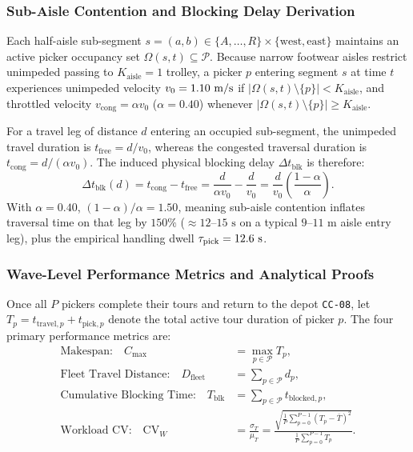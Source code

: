\documentclass[11pt,a4paper]{article}
\begin{document}
\subsubsection{Sub-Aisle Contention and Blocking Delay Derivation}
Each half-aisle sub-segment $s = (a, b) \in \{A, \dots, R\} \times \{\text{west}, \text{east}\}$ maintains an active picker occupancy set $\Omega(s, t) \subseteq \mathcal{P}$. Because narrow footwear aisles restrict unimpeded passing to $K_{\text{aisle}} = 1$ trolley, a picker $p$ entering segment $s$ at time $t$ experiences unimpeded velocity $v_0 = 1.10\text{ m/s}$ if $|\Omega(s, t) \setminus \{p\}| < K_{\text{aisle}}$, and throttled velocity $v_{\text{cong}} = \alpha v_0$ ($\alpha = 0.40$) whenever $|\Omega(s, t) \setminus \{p\}| \ge K_{\text{aisle}}$.

For a travel leg of distance $d$ entering an occupied sub-segment, the unimpeded travel duration is $t_{\text{free}} = d / v_0$, whereas the congested traversal duration is $t_{\text{cong}} = d / (\alpha v_0)$. The induced physical blocking delay $\Delta t_{\text{blk}}$ is therefore:
\begin{equation}
    \Delta t_{\text{blk}}(d) = t_{\text{cong}} - t_{\text{free}} = \frac{d}{\alpha v_0} - \frac{d}{v_0} = \frac{d}{v_0}\left(\frac{1 - \alpha}{\alpha}\right).
\end{equation}
With $\alpha = 0.40$, $(1 - \alpha)/\alpha = 1.50$, meaning sub-aisle contention inflates traversal time on that leg by $150\%$ ($\approx 12\text{--}15\text{ s}$ on a typical $9\text{--}11\text{ m}$ aisle entry leg), plus the empirical handling dwell $\tau_{\text{pick}} = 12.6\text{ s}$.

\subsubsection{Wave-Level Performance Metrics and Analytical Proofs}
Once all $P$ pickers complete their tours and return to the depot \texttt{CC-08}, let $T_p = t_{\text{travel}, p} + t_{\text{pick}, p}$ denote the total active tour duration of picker $p$. The four primary performance metrics are:
\begin{align}
    \text{Makespan:} \quad C_{\max} &= \max_{p \in \mathcal{P}} T_p, \\
    \text{Fleet Travel Distance:} \quad D_{\text{fleet}} &= \sum_{p \in \mathcal{P}} d_p, \\
    \text{Cumulative Blocking Time:} \quad T_{\text{blk}} &= \sum_{p \in \mathcal{P}} t_{\text{blocked}, p}, \\
    \text{Workload CV:} \quad \text{CV}_W &= \frac{\sigma_T}{\mu_T} = \frac{\sqrt{\frac{1}{P}\sum_{p=0}^{P-1} (T_p - \bar{T})^2}}{\frac{1}{P}\sum_{p=0}^{P-1} T_p}.
\end{align}
\end{document}
